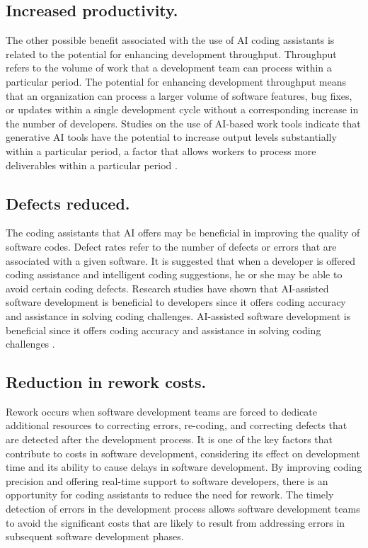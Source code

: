 \subsection {Increased productivity.}
\label{sec:Increased productivity}
The other possible benefit associated with the use of AI coding assistants is related to the potential for enhancing development throughput. Throughput refers to the volume of work that a development team can process within a particular period. The potential for enhancing development throughput means that an organization can process a larger volume of software features, bug fixes, or updates within a single development cycle without a corresponding increase in the number of developers. Studies on the use of AI-based work tools indicate that generative AI tools have the potential to increase output levels substantially within a particular period, a factor that allows workers to process more deliverables within a particular period \autocite{Noy2023}.

\subsection {Defects reduced.}
\label{sec:Defects reduced}
The coding assistants that AI offers may be beneficial in improving the quality of software codes. Defect rates refer to the number of defects or errors that are associated with a given software. It is suggested that when a developer is offered coding assistance and intelligent coding suggestions, he or she may be able to avoid certain coding defects. Research studies have shown that AI-assisted software development is beneficial to developers since it offers coding accuracy and assistance in solving coding challenges. AI-assisted software development is beneficial since it offers coding accuracy and assistance in solving coding challenges \autocite{Peng2023}.

\subsection {Reduction in rework costs.}
\label{sec:Reduction in rework costs}
Rework occurs when software development teams are forced to dedicate additional resources to correcting errors, re-coding, and correcting defects that are detected after the development process. It is one of the key factors that contribute to costs in software development, considering its effect on development time and its ability to cause delays in software development. By improving coding precision and offering real-time support to software developers, there is an opportunity for coding assistants to reduce the need for rework. The timely detection of errors in the development process allows software development teams to avoid the significant costs that are likely to result from addressing errors in subsequent software development phases.

